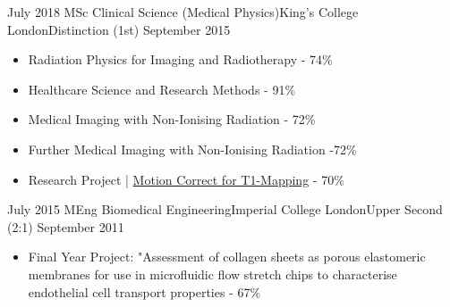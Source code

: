 %
%
%


\begin{education}
  \degree
    {July 2018}   {MSc Clinical Science (Medical Physics)}{King's College London}{Distinction (1st)}
    {September 2015} {
                      \begin{itemize}
                        \item Radiation Physics for Imaging and Radiotherapy - 74\%
                          \item Healthcare Science and Research Methods - 91\%
                          \item Medical Imaging with Non-Ionising Radiation - 72\%
                          \item Further Medical Imaging with Non-Ionising Radiation -72\%
                          \item Research Project | {\color{linkcolor}\href{https://drive.google.com/file/d/1OW5mCCDkiLmFHwEo0NrTMILELdWyMrdJ/view?usp=sharing}{Motion Correct for T1-Mapping}} - 70\%
                      \end{itemize}
                    }
  \emptySeparator

  \degree
        {July 2015}   {MEng Biomedical Engineering}{Imperial College London}{Upper Second (2:1)}
    {September 2011} {
                      \begin{itemize}
                        \item Final Year Project: "Assessment of collagen sheets as porous elastomeric
                              membranes for use in microfluidic flow stretch chips to
                              characterise endothelial cell transport properties - 67\%
                      \end{itemize}
                    }
  \emptySeparator

\end{education}